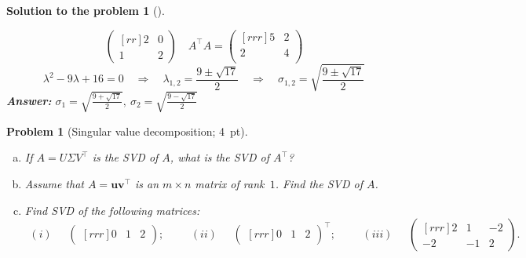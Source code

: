 \documentclass[12pt,a4]{article}
\newtheorem{problem}{Problem}
\newtheorem{solution}{Solution to the problem}
\newcommand{\bu}{{\mathbf u}}
\newcommand{\bv}{{\mathbf v}}
\newcommand{\answer}[1]{\textbf{Answer:} #1}
\begin{document}
\begin{solution}[]
\begin{enumerate}[(a)]
\begin{enumerate}[(i)]
\[\begin{pmatrix}[rr]
2 &  0 \\
1 & 2
\end{pmatrix}
\quad
A^\top A = 
\begin{pmatrix}[rrr]
5 & 2\\
2 & 4\\
\end{pmatrix}
\]
\[
\lambda^2 - 9 \lambda + 16 = 0
\quad
\Rightarrow
\quad
\lambda_{1,2} = \frac{9 \pm \sqrt{17}}{2}
\quad
\Rightarrow
\quad
\sigma_{1,2} = \sqrt{\frac{9 \pm \sqrt{17}}{2}}
\]
\answer{$\sigma_1 = \sqrt{\frac{9 + \sqrt{17}}{2}}, ~ \sigma_2 = \sqrt{\frac{9 - \sqrt{17}}{2}}$}\\[5pt]
\end{enumerate}
\end{enumerate}
\end{solution}

\begin{problem}[Singular value decomposition; 4~pt]\label{prb:13.2}\rm
	\begin{enumerate}[(a)]
		\item If $A = U\Sigma V^\top$ is the SVD of $A$, what is the SVD of $A^\top$?
		\item Assume that $A = \bu\bv^\top$ is an $m\times n$ matrix of rank~$1$. Find the SVD of $A$.
		\item Find SVD of the following matrices:
		\[
		\begin{matrix} (i) \end{matrix} \quad
		\begin{pmatrix}[rrr]
		0 & 1 & 2
		\end{pmatrix};
		\qquad
		\begin{matrix} (ii) \end{matrix} \quad
		\begin{pmatrix}[rrr]
		0 & 1 & 2
		\end{pmatrix}^\top;
		\qquad
	 	\begin{matrix} (iii) \end{matrix} \quad  
	 	\begin{pmatrix}[rrr]
		2 & 1 & -2 \\ -2 & -1 & 2
		\end{pmatrix}.
		\]
	\end{enumerate}
\end{problem}
\end{document}
